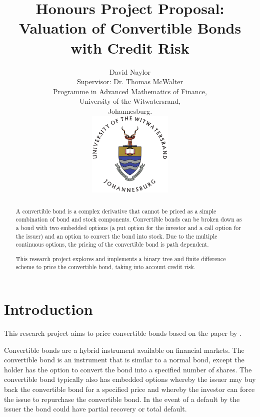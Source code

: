 \documentclass[a4paper,11pt,oneside]{article}
\title{Honours Project Proposal:\\
Valuation of Convertible Bonds with Credit Risk}
\author{David Naylor\\[1cm]
Supervisor: Dr. Thomas McWalter\\[3cm]
Programme in Advanced Mathematics of Finance,\\
University of the Witwatersrand,\\
Johannesburg.\\[2cm]
\includegraphics[width=4cm]{../common/WitsColourLogo}\\[2cm]
}
\newcommand{\setlinespacing}[1]
           {\renewcommand{\baselinestretch}{#1}\small\normalsize}
\begin{document}
\maketitle
\thispagestyle{empty}

\setlinespacing{1.20}
\newpage

\setcounter{page}{1}


\def\abstractname{\Large Abstract}
\begin{abstract}
A convertible bond is a complex derivative that cannot be priced as a simple combination of bond and stock components.  Convertible bonds can be broken down as a bond with two embedded options (a put option for the investor and a call option for the issuer) and an option to convert the bond into stock.  Due to the multiple continuous options, the pricing of the convertible bond is path dependent.

This research project explores and implements a binary tree and finite difference scheme to price the convertible bond, taking into account credit risk.
\end{abstract}



\section{Introduction}
This research project aims to price convertible bonds based on the paper by \citet{AFV03}.

Convertible bonds are a hybrid instrument available on financial markets.  The convertible bond is an instrument that is similar to a normal bond, except the holder has the option to convert the bond into a specified number of shares.  The convertible bond typically also has embedded options whereby the issuer may buy back the convertible bond for a specified price and whereby the investor can force the issue to repurchase the convertible bond.  In the event of a default by the issuer the bond could have partial recovery or total default.
\end{document}
